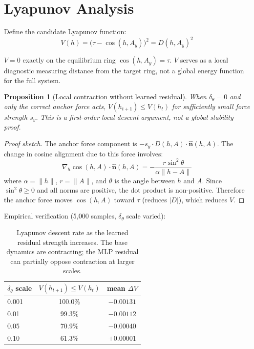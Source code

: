 \documentclass[11pt]{article}
\newtheorem{proposition}{Proposition}
\newcommand{\anchor}[1]{A_{#1}}
\newcommand{\barrier}{\tau}
\newcommand{\dive}{D}
\newcommand{\nhat}{\hat{\bm{n}}}
\begin{document}
\section{Lyapunov Analysis}
\label{sec:lyapunov}

Define the candidate Lyapunov function:
\begin{equation}
\label{eq:lyapunov}
    V(h) = \big(\barrier - \cos(h, \anchor{y})\big)^2 = \dive(h, \anchor{y})^2
\end{equation}

$V = 0$ exactly on the equilibrium ring $\cos(h, A_y) = \barrier$.
$V$ serves as a local diagnostic measuring distance from the target
ring, not a global energy function for the full system.

\begin{proposition}[Local contraction without learned residual]
When $\delta_\theta = 0$ and only the correct anchor force acts,
$V(h_{t+1}) \leq V(h_t)$ for sufficiently small force strength $s_y$.
This is a first-order local descent argument, not a global stability
proof.
\end{proposition}

\begin{proof}[Proof sketch]
The anchor force component is $-s_y \cdot \dive(h, A) \cdot \nhat(h, A)$.
The change in cosine alignment due to this force involves:
\[
    \nabla_h \cos(h, A) \cdot \nhat(h, A)
    = -\frac{r \sin^2\theta}{\alpha \|h - A\|}
\]
where $\alpha = \|h\|$, $r = \|A\|$, and $\theta$ is the angle
between $h$ and $A$. Since $\sin^2\theta \geq 0$ and all norms are
positive, the dot product is non-positive. Therefore the anchor force
moves $\cos(h, A)$ toward $\barrier$ (reduces $|\dive|$), which
reduces $V$.
\end{proof}

Empirical verification (5,000 samples, $\delta_\theta$ scale varied):

\begin{table}[ht]
\centering
\begin{tabular}{@{}lcc@{}}
\toprule
$\delta_\theta$ scale & $V(h_{t+1}) \leq V(h_t)$ & mean $\Delta V$ \\
\midrule
0.001 & 100.0\% & $-0.00131$ \\
0.01  & 99.3\%  & $-0.00112$ \\
0.05  & 70.9\%  & $-0.00040$ \\
0.10  & 61.3\%  & $+0.00001$ \\
\bottomrule
\end{tabular}
\caption{Lyapunov descent rate as the learned residual strength increases.
The base dynamics are contracting; the MLP residual can partially oppose
contraction at larger scales.}
\label{tab:lyapunov}
\end{table}
\end{document}
